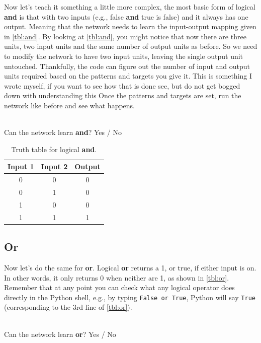 \documentclass[a4paper,10pt]{article}
\begin{document}
Now let's teach it something a little more complex, the most basic form of logical \textbf{and} is that with two inputs (e.g., false \textbf{and} true is false) and it always has one output. Meaning that the network needs to learn the input-output mapping given in \autoref{tbl:and}. By looking at \autoref{tbl:and}, you might notice that now there are three units, two input units and the same number of output units as before. So we need to modify the network to have two input units, leaving the single output unit untouched. Thankfully, the code can figure out the number of input and output units required based on the patterns and targets you give it. This is something I wrote myself, if you want to see how that is done see, but do not get bogged down with understanding this  %
Once the patterns and targets are set, run the network like before and see what happens.

\ \\ Can the network learn \textbf{and}?    Yes / No                                             

\begin{table}[ht]
 \centering
 \begin{tabular}[t]{ccc}
Input 1 & Input 2 & Output\\ \hline
0 & 0 & 0\\
0 & 1 & 0 \\
1 & 0 & 0 \\
1 & 1 & 1 \\

\end{tabular} \caption{Truth table for logical \textbf{and}.}
 \label{tbl:and}
\end{table}

\subsection{Or}

Now let's do the same for \textbf{or}. Logical \textbf{or} returns a 1, or true, if either input is on. In other words, it only returns 0 when neither are 1, as shown in \autoref{tbl:or}. Remember that at any point you can check what any logical operator does directly in the Python shell, e.g., by typing \texttt{False or True}, Python will say \texttt{True} (corresponding to the 3rd line of \autoref{tbl:or}).

\ \\ Can the network learn \textbf{or}?    Yes / No                                             
\end{document}
